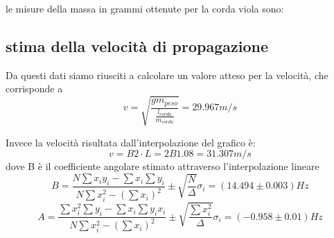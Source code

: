 \documentclass[a4paper]{article}
\theoremstyle{definition}
\begin{document}
\noindent le misure della massa in grammi ottenute per la corda viola sono:
\begin{figure}[!ht]
\end{figure}

	\subsection{stima della velocità di propagazione}
\noindent Da questi dati siamo riusciti a calcolare un valore atteso per la velocità, che corrisponde a
\[v = \sqrt{\frac{ g m_{peso} }{\frac{l_{corda}}{m_{corda}}}} = 29.967 m/s\]

\noindent Invece la velocità risultata dall'interpolazione del grafico è: \[v = B2 \cdot L = 2B 1.08 = 31.307 m/s\] dove B è il coefficiente angolare stimato attraverso l'interpolazione lineare
 \[B = \frac{N\sum x_{i}y_{i}-\sum x_{i}\sum y_{i}}{N\sum x_{i}^{2}-(\sum x_{i})^{2}} \pm \sqrt{\frac{N}{\Delta }}\sigma _{i} = (14.494 \pm 0.003) Hz\]
\[A = \frac{\sum x_{i}^{2}\sum y_{i}-\sum x_{i}\sum y_{i}x_{i}}{N\sum x_{i}^{2}-(\sum x_{i})^{2}} \pm \sqrt{\frac{\sum x_{i}^{2}}{\Delta }}\sigma _{i} = (-0.958 \pm 0.01) Hz\]
\begin{figure}[!ht]
\end{figure}
\end{document}
